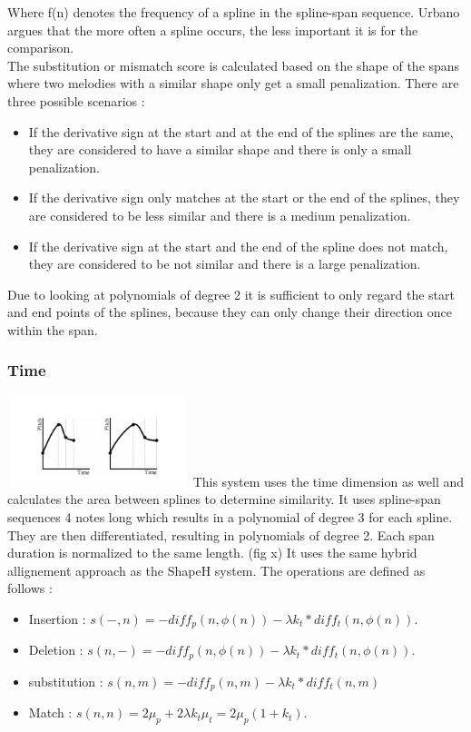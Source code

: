 \documentclass{llncs}
\begin{document}
        Where f(n) denotes the frequency of a spline in the spline-span sequence. Urbano argues that the more often a spline occurs, the less important it is for the comparison. \\
        The substitution or mismatch score is calculated based on the shape of the spans where two melodies with a similar shape only get a small penalization. There are three possible scenarios : 
        \begin{itemize}
         \item If the derivative sign at the start and at the end of the splines are the same, they are considered to have a similar shape and there is only a small penalization.
         \item If the derivative sign only matches at the start or the end of the splines, they are considered to be less similar and there is a medium penalization.
         \item If the derivative sign at the start and the end of the spline does not match, they are considered to be not similar and there is a large penalization.
        \end{itemize}
        Due to looking at polynomials of degree 2 it is sufficient to only regard the start and end points of the splines, because they can only change their direction once within the span.
  
		
		\subsubsection{Time}
		
		  \includegraphics[width=200px,height=100px,keepaspectratio]{two_of_five_point_one}
        This system uses the time dimension as well and calculates the area between splines to determine similarity. It uses spline-span sequences 4 notes long which results in a polynomial of degree 3 for each spline. They are then differentiated, resulting in polynomials of degree 2. Each span duration is normalized to the same length. (fig x)
        It uses the same hybrid allignement approach as the ShapeH system. 
		The operations are defined as follows : 
        \begin{itemize}
         \item Insertion : 
        $ s(-,n) = -diff _p(n, \phi(n)) - \lambda k_t * diff_t(n, \phi(n)).$
        \item Deletion : 
         $s(n,-) = -diff_p(n, \phi(n)) - \lambda k_t * diff_t (n, \phi(n)).$
       \item substitution : 
       $s(n,m) = - diff_p (n,m) - \lambda k_t * diff_t (n,m) $
       \item Match : 
        $s(n,n) = 2\mu_p + 2\lambda k_t \mu_t = 2\mu_p (1+k_t).$
        \end{itemize}
        
\end{document}
